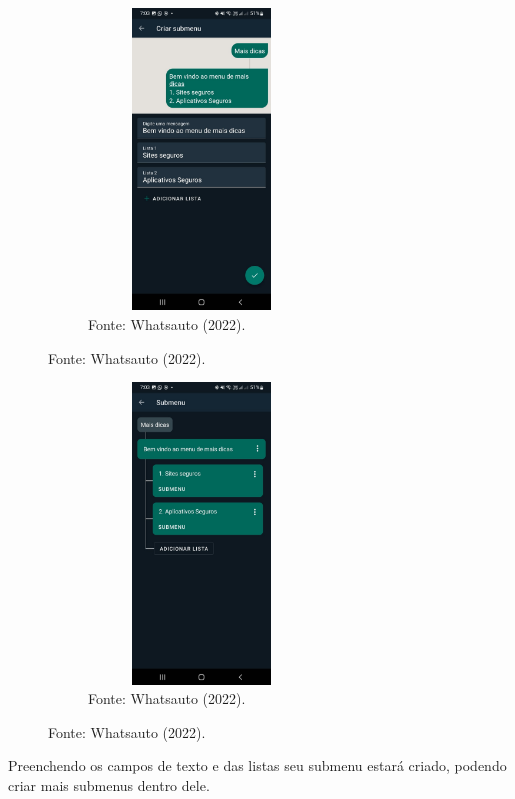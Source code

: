 \begin{itemize}
\begin{figure}[!htb]
\centering
\captionsetup[subfigure]{labelformat=empty}
\caption{``Submenu 2''}
\begin{subfigure}{.5\textwidth}
\centering
\includegraphics[width=6cm,height=8cm]{Bot/Partes/Imagens/Submenu 2.jpeg}
\caption{Fonte: Whatsauto (2022).}
\end{subfigure}%
\end{figure}

\begin{figure}[!htb]
\centering
\captionsetup[subfigure]{labelformat=empty}
\caption{``Submenu 3''}
\begin{subfigure}{.5\textwidth}
\centering
\includegraphics[width=6cm,height=8cm]{Bot/Partes/Imagens/Submenu 3.jpeg}
\caption{Fonte: Whatsauto (2022).}
\end{subfigure}%
\end{figure}

        \newpage
        
        Preenchendo os campos de texto e das listas seu submenu estará criado, podendo criar mais submenus dentro dele. \\


\end{itemize}
